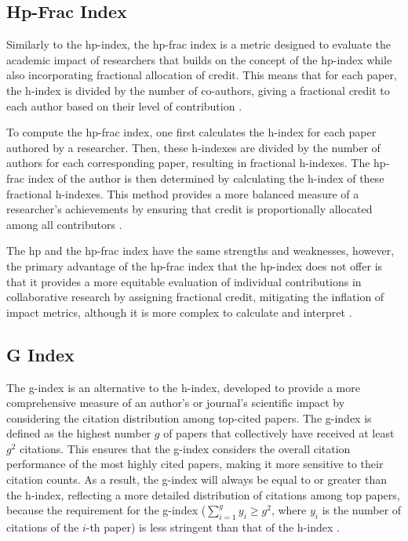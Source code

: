 \subsection{Hp-Frac Index}
Similarly to the hp-index, the hp-frac index is a metric designed to evaluate
the academic impact of researchers that builds on the concept of the hp-index
while also incorporating fractional allocation of credit. This means that for
each paper, the h-index is divided by the number of co-authors, giving a
fractional credit to each author based on their level of contribution
\cite{singhal2023hp}.

To compute the hp-frac index, one first calculates the h-index for each paper
authored by a researcher. Then, these h-indexes are divided by the number of
authors for each corresponding paper, resulting in fractional h-indexes. The
hp-frac index of the author is then determined by calculating the h-index of
these fractional h-indexes. This method provides a more balanced measure of a
researcher's achievements by ensuring that credit is proportionally allocated among
all contributors \cite{singhal2023hp}.

The hp and the hp-frac index have the same strengths and weaknesses, however,
the primary advantage of the hp-frac index that the hp-index does not offer is
that it provides a more equitable evaluation of individual contributions in
collaborative research by assigning fractional credit, mitigating the inflation
of impact metrics, although it is more complex to calculate and interpret
\cite{singhal2023hp}.

\subsection{G Index}
The g-index is an alternative to the h-index, developed to provide a more
comprehensive measure of an author's or journal's scientific impact by
considering the citation distribution among top-cited papers. The g-index is
defined as the highest number $g$ of papers that collectively have received at
least $g^2$ citations. This ensures that the g-index considers the overall
citation performance of the most highly cited papers, making it more sensitive
to their citation counts. As a result, the g-index will always be equal to or
greater than the h-index, reflecting a more detailed distribution of citations
among top papers, because the requirement for the g-index ($\sum_{i=1}^{g} y_i
    \geq g^2$, where $y_i$ is the number of citations of the $i$-th paper) is less
stringent than that of the h-index \cite{egghe2008mathematical,
    egghe2006improvement}.


